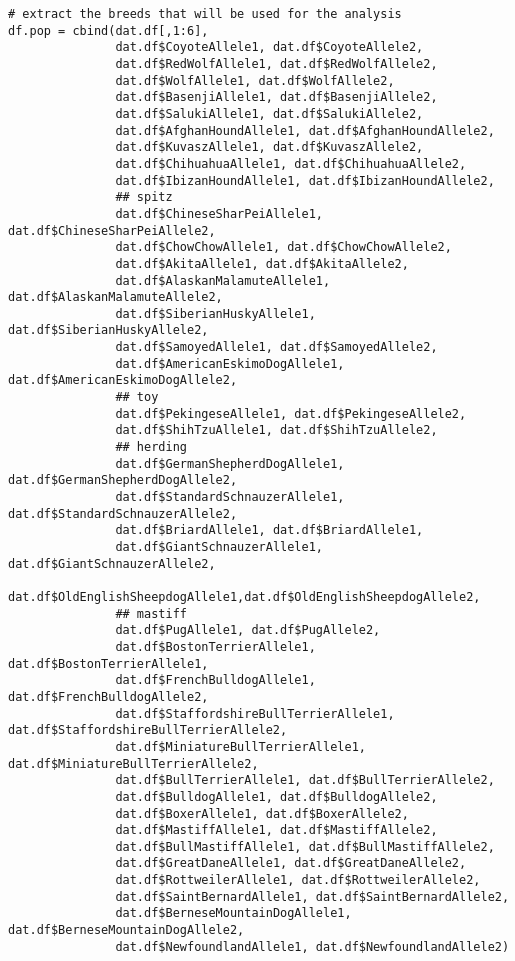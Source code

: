 \documentclass{article} %
\begin{document}
{\begin{verbatim}
# extract the breeds that will be used for the analysis
df.pop = cbind(dat.df[,1:6],
               dat.df$CoyoteAllele1, dat.df$CoyoteAllele2, 
               dat.df$RedWolfAllele1, dat.df$RedWolfAllele2, 
               dat.df$WolfAllele1, dat.df$WolfAllele2, 
               dat.df$BasenjiAllele1, dat.df$BasenjiAllele2, 
               dat.df$SalukiAllele1, dat.df$SalukiAllele2, 
               dat.df$AfghanHoundAllele1, dat.df$AfghanHoundAllele2,
               dat.df$KuvaszAllele1, dat.df$KuvaszAllele2, 
               dat.df$ChihuahuaAllele1, dat.df$ChihuahuaAllele2, 
               dat.df$IbizanHoundAllele1, dat.df$IbizanHoundAllele2,
               ## spitz
               dat.df$ChineseSharPeiAllele1, dat.df$ChineseSharPeiAllele2,
               dat.df$ChowChowAllele1, dat.df$ChowChowAllele2,
               dat.df$AkitaAllele1, dat.df$AkitaAllele2,
               dat.df$AlaskanMalamuteAllele1, dat.df$AlaskanMalamuteAllele2,
               dat.df$SiberianHuskyAllele1, dat.df$SiberianHuskyAllele2,
               dat.df$SamoyedAllele1, dat.df$SamoyedAllele2,
               dat.df$AmericanEskimoDogAllele1, dat.df$AmericanEskimoDogAllele2,
               ## toy
               dat.df$PekingeseAllele1, dat.df$PekingeseAllele2,
               dat.df$ShihTzuAllele1, dat.df$ShihTzuAllele2,
               ## herding
               dat.df$GermanShepherdDogAllele1, dat.df$GermanShepherdDogAllele2,
               dat.df$StandardSchnauzerAllele1, dat.df$StandardSchnauzerAllele2,
               dat.df$BriardAllele1, dat.df$BriardAllele1,
               dat.df$GiantSchnauzerAllele1, dat.df$GiantSchnauzerAllele2,
               dat.df$OldEnglishSheepdogAllele1,dat.df$OldEnglishSheepdogAllele2,
               ## mastiff
               dat.df$PugAllele1, dat.df$PugAllele2,
               dat.df$BostonTerrierAllele1, dat.df$BostonTerrierAllele1,
               dat.df$FrenchBulldogAllele1, dat.df$FrenchBulldogAllele2,
               dat.df$StaffordshireBullTerrierAllele1, dat.df$StaffordshireBullTerrierAllele2,
               dat.df$MiniatureBullTerrierAllele1, dat.df$MiniatureBullTerrierAllele2,
               dat.df$BullTerrierAllele1, dat.df$BullTerrierAllele2,
               dat.df$BulldogAllele1, dat.df$BulldogAllele2,
               dat.df$BoxerAllele1, dat.df$BoxerAllele2,
               dat.df$MastiffAllele1, dat.df$MastiffAllele2,
               dat.df$BullMastiffAllele1, dat.df$BullMastiffAllele2,
               dat.df$GreatDaneAllele1, dat.df$GreatDaneAllele2,
               dat.df$RottweilerAllele1, dat.df$RottweilerAllele2,
               dat.df$SaintBernardAllele1, dat.df$SaintBernardAllele2,
               dat.df$BerneseMountainDogAllele1, dat.df$BerneseMountainDogAllele2,
               dat.df$NewfoundlandAllele1, dat.df$NewfoundlandAllele2)


\end{verbatim}}
\end{document}

